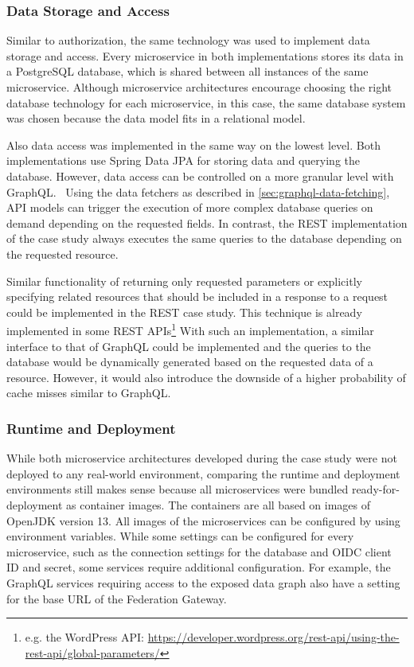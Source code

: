 \subsubsection{Data Storage and Access}\label{sec:comp-data}

Similar to authorization, the same technology was used to implement data storage and access.
Every microservice in both implementations stores its data in a PostgreSQL database, which is shared between all instances of the same microservice.
Although microservice architectures encourage choosing the right database technology for each microservice, in this case, the same database system was chosen because the data model fits in a relational model.

Also data access was implemented in the same way on the lowest level.
Both implementations use Spring Data \ac{JPA} for storing data and querying the database.
However, data access can be controlled on a more granular level with GraphQL.~
Using the data fetchers as described in \autoref{sec:graphql-data-fetching}, \ac{API} models can trigger the execution of more complex database queries on demand depending on the requested fields.
In contrast, the \ac{REST} implementation of the case study always executes the same queries to the database depending on the requested resource.

Similar functionality of returning only requested parameters or explicitly specifying related resources that should be included in a response to a request could be implemented in the \ac{REST} case study.
This technique is already implemented in some \ac{REST} \acp{API}\footnote{e.g. the WordPress \ac{API}: \url{https://developer.wordpress.org/rest-api/using-the-rest-api/global-parameters/}}
With such an implementation, a similar interface to that of GraphQL could be implemented and the queries to the database would be dynamically generated based on the requested data of a resource.
However, it would also introduce the downside of a higher probability of cache misses similar to GraphQL.

\subsubsection{Runtime and Deployment}\label{sec:comp-runtime}

While both microservice architectures developed during the case study were not deployed to any real-world environment, comparing the runtime and deployment environments still makes sense because all microservices were bundled ready-for-deployment as container images.
The containers are all based on images of Open\acs{JDK} version 13.
All images of the microservices can be configured by using environment variables.
While some settings can be configured for every microservice, such as the connection settings for the database and \ac{OIDC} client ID and secret, some services require additional configuration.
For example, the GraphQL services requiring access to the exposed data graph also have a setting for the base \ac{URL} of the Federation Gateway.

